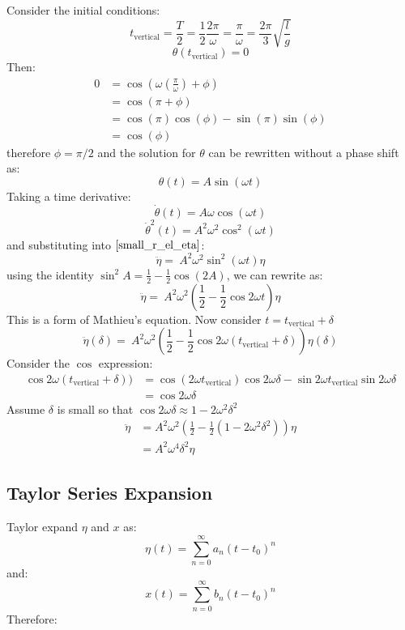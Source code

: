 \documentclass[9pt]{report}
\begin{document}
\begin{enumerate}
Consider the initial conditions:
\[
  t_\text{vertical} = \frac{T}{2} = \frac{1}{2} \frac{2\pi}{\omega} = \frac{\pi}{\omega} = \frac{2\pi}{3}\sqrt{\frac{l}{g}}
\]  
\[
 \theta(t_\text{vertical}) = 0
\]
Then:
\[
\begin{align}
0 &= \cos(\omega (\frac{\pi}{\omega}) + \phi) \\
  &= \cos(\pi + \phi)\\
  &= \cos(\pi)\cos(\phi)-\sin(\pi)\sin(\phi)\\
  &= \cos(\phi)
\end{align}
\]
therefore $\phi = \pi/2$ and the solution for $\theta$ can be rewritten without
a phase shift as:
\[
  \theta(t) = A \sin(\omega t)
\]
Taking a time derivative:
\[
\dot{\theta}(t) = A\omega \cos (\omega t)
\]
\[
\dot{\theta}^2(t) = A^2\omega^2 \cos^2 (\omega t)
\]
and substituting into $\ref{small_r_el_eta}$:
\[
\ddot{\eta} = \ A^2 \omega^2 \sin^2 (\omega t) \eta
\]
using the identity $\sin^2A = \frac{1}{2} - \frac{1}{2} \cos(2A)$, we can
rewrite as:
\[
  \ddot{\eta} = \ A^2 \omega^2 (\frac{1}{2} - \frac{1}{2} \cos 2\omega t) \eta
\]
This is a form of Mathieu's equation. Now consider $t = t_\text{vertical} + \delta$
\[
  \ddot{\eta}(\delta) = \ A^2 \omega^2 (\frac{1}{2} - \frac{1}{2} \cos 2\omega(t_\text{vertical} + \delta))\eta(\delta)
\]
Consider the $\cos$ expression:
\[
\begin{align}
\cos 2\omega(t_\text{vertical} + \delta)) &= \cos(2\omega t_\text{vertical}) \cos 2 \omega \delta - \sin 2\omega t_\text{vertical} \sin 2 \omega \delta \\
                                          &= \cos 2 \omega \delta
\end{align}
\]
Assume $\delta$ is small so that $\cos 2\omega \delta \approx 1 - 2\omega^2 \delta^2$
\[
\begin{align}
  \ddot{\eta} &= A^2 \omega^2 (\frac{1}{2} - \frac{1}{2} (1 - 2\omega^2 \delta^2)) \eta \\
              &= A^2 \omega^4 \delta^2 \eta 
\end{align}
\]
\subsection{Taylor Series Expansion}
Taylor expand $\eta$ and $x$ as:
\[
  \eta(t) = \sum_{n=0}^\infty a_n (t-t_0)^n
\]
and:
\[
  x(t) = \sum_{n=0}^\infty b_n (t-t_0)^n
\]
Therefore:
\end{enumerate}
\end{document}
